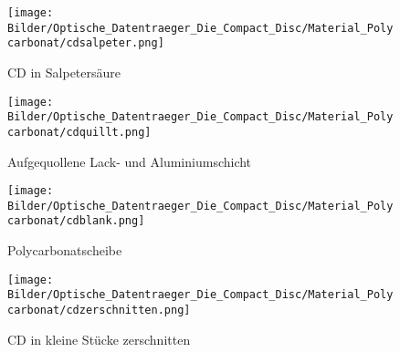 \begin{figure}[h]
    \begin{center}
        \begin{minipage}[t]{0.4\textwidth}
            \begin{center}
                \texttt{[image: Bilder/Optische\_Datentraeger\_Die\_Compact\_Disc/Material\_Polycarbonat/cdsalpeter.png]}
                \caption[CD in Salpetersäure]{CD in Salpetersäure}
                \label{fig:cdsalpeter}
            \end{center}
        \end{minipage}
        \hspace{0.025\textwidth}
        \begin{minipage}[t]{0.4\textwidth}
            \begin{center}
                \texttt{[image: Bilder/Optische\_Datentraeger\_Die\_Compact\_Disc/Material\_Polycarbonat/cdquillt.png]}
                \caption[\qlqq Aufgequolleney\grqq{} Lack- und Aluminiumschicht]{\glqq Aufgequollene\grqq{} Lack- und Aluminiumschicht}
                \label{fig:cdquillt}
            \end{center}
        \end{minipage}
    \end{center}
\end{figure}

\begin{figure}[h]
    \begin{center}
        \begin{minipage}[t]{0.4\textwidth}
            \begin{center}
                \texttt{[image: Bilder/Optische\_Datentraeger\_Die\_Compact\_Disc/Material\_Polycarbonat/cdblank.png]}
                \caption[Polycarbonatscheibe]{Polycarbonatscheibe}
                \label{fig:cdblank}
            \end{center}
        \end{minipage}
        \hspace{0.025\textwidth}
        \begin{minipage}[t]{0.4\textwidth}
            \begin{center}
                \texttt{[image: Bilder/Optische\_Datentraeger\_Die\_Compact\_Disc/Material\_Polycarbonat/cdzerschnitten.png]}
                \caption[CD in kleine Stücke zerschnitten]{CD in kleine Stücke zerschnitten}
                \label{fig:cdzerschnitten}
            \end{center}
        \end{minipage}
    \end{center}
\end{figure}


